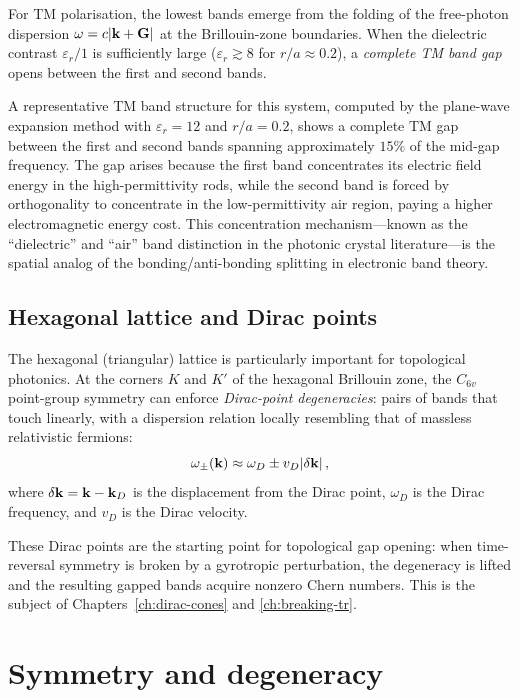 For TM polarisation, the lowest bands emerge from the folding of the
free-photon dispersion $\omega=c|\mathbf{k}+\mathbf{G}|$ at the Brillouin-zone
boundaries.  When the dielectric contrast $\varepsilon_r/1$ is
sufficiently large ($\varepsilon_r\gtrsim 8$ for $r/a\approx 0.2$), a
\emph{complete TM band gap} opens between the first and second bands.

A representative TM band structure for this system, computed by the
plane-wave expansion method with $\varepsilon_r=12$ and $r/a=0.2$,
shows a complete TM gap between the first and second bands spanning
approximately $15\%$ of the mid-gap frequency.  The gap arises because
the first band concentrates its electric field energy in the
high-permittivity rods, while the second band is forced by
orthogonality to concentrate in the low-permittivity air region,
paying a higher electromagnetic energy cost.  This concentration
mechanism---known as the ``dielectric'' and ``air'' band distinction
in the photonic crystal literature---is the spatial analog of the
bonding/anti-bonding splitting in electronic band theory.

\subsection{Hexagonal lattice and Dirac points}
\label{sec:ch4-hex-dirac}

The hexagonal (triangular) lattice is particularly important for
topological photonics.  At the corners $K$ and $K'$ of the hexagonal
Brillouin zone, the $C_{6v}$ point-group symmetry can enforce
\emph{Dirac-point degeneracies}: pairs of bands that touch linearly,
with a dispersion relation locally resembling that of massless
relativistic fermions:
\begin{equation}\label{eq:ch4-dirac-dispersion}
  \omega_\pm(\mathbf{k}) \approx \omega_D \pm v_D|\delta\mathbf{k}|\,,
\end{equation}
where $\delta\mathbf{k}=\mathbf{k}-\mathbf{k}_D$ is the displacement from the Dirac
point, $\omega_D$ is the Dirac frequency, and $v_D$ is the Dirac
velocity.

These Dirac points are the starting point for topological gap opening:
when time-reversal symmetry is broken by a gyrotropic perturbation, the
degeneracy is lifted and the resulting gapped bands acquire nonzero
Chern numbers.  This is the subject of Chapters~\ref{ch:dirac-cones}
and \ref{ch:breaking-tr}.

\section{Symmetry and degeneracy}
\label{sec:ch4-symmetry}

